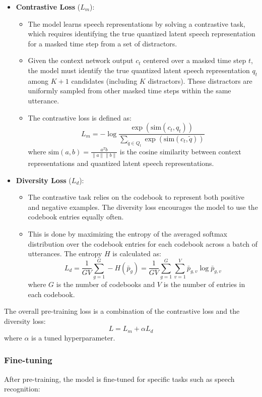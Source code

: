 \documentclass{article}
\begin{document}
\begin{itemize}
  \item \textbf{Contrastive Loss} ($L_m$):
    \begin{itemize}
      \item The model learns speech representations by solving a contrastive task, which requires identifying the true quantized latent speech representation for a masked time step from a set of distractors.
      \item Given the context network output \( c_t \) centered over a masked time step \( t \), the model must identify the true quantized latent speech representation \( q_t \) among \( K + 1 \) candidates (including \( K \) distractors). These distractors are uniformly sampled from other masked time steps within the same utterance.
      \item The contrastive loss is defined as:
      \[
      L_m = -\log \frac{\exp(\text{sim}(c_t, q_t))}{\sum_{\tilde{q} \in Q_t} \exp(\text{sim}(c_t, \tilde{q}))}
      \]
      where \(\text{sim}(a, b) = \frac{a^T b}{\|a\| \|b\|}\) is the cosine similarity between context representations and quantized latent speech representations.
    \end{itemize}
    
  \pagebreak
  
  \item \textbf{Diversity Loss} ($L_d$):
    \begin{itemize}
      \item The contrastive task relies on the codebook to represent both positive and negative examples. The diversity loss encourages the model to use the codebook entries equally often.
      \item This is done by maximizing the entropy of the averaged softmax distribution over the codebook entries for each codebook across a batch of utterances. The entropy \( H \) is calculated as:
      \[
      L_d = \frac{1}{GV} \sum_{g=1}^G -H(\bar{p}_g) = \frac{1}{GV} \sum_{g=1}^G \sum_{v=1}^V \bar{p}_{g,v} \log \bar{p}_{g,v}
      \]
      where \( G \) is the number of codebooks and \( V \) is the number of entries in each codebook.
    \end{itemize}
\end{itemize}

The overall pre-training loss is a combination of the contrastive loss and the diversity loss:
\[
L = L_m + \alpha L_d
\]
where \( \alpha \) is a tuned hyperparameter.

\subsubsection{Fine-tuning}
After pre-training, the model is fine-tuned for specific tasks such as speech recognition:
\end{document}
